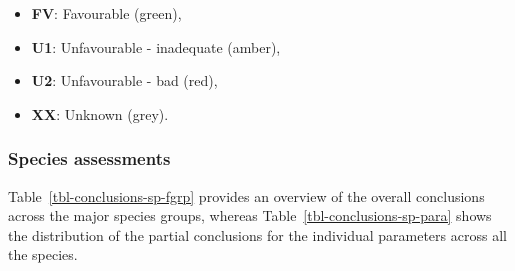 \documentclass[
  letterpaper,
  DIV=11,
  numbers=noendperiod]{scrartcl}
\providecommand{\tightlist}{%
  \setlength{\itemsep}{0pt}\setlength{\parskip}{0pt}}
\begin{document}
\begin{itemize}
\tightlist
\item
  \textbf{FV}: Favourable (green),
\item
  \textbf{U1}: Unfavourable - inadequate (amber),
\item
  \textbf{U2}: Unfavourable - bad (red),
\item
  \textbf{XX}: Unknown (grey).
\end{itemize}

\subsubsection{Species assessments}\label{species-assessments}

Table~\ref{tbl-conclusions-sp-fgrp} provides an overview of the overall
conclusions across the major species groups, whereas
Table~\ref{tbl-conclusions-sp-para} shows the distribution of the
partial conclusions for the individual parameters across all the
species.

\begin{table}

\caption{\label{tbl-conclusions-sp-fgrp}}


\end{table}%
\end{document}
